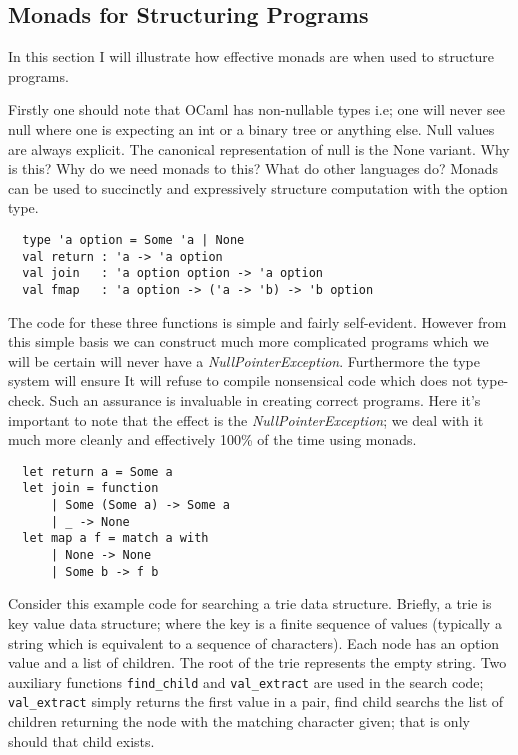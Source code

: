 \documentclass[a4paper,10pt]{article}
\theoremstyle{definition}
\begin{document}
\subsection{Monads for Structuring Programs}
In this section I will illustrate how effective monads are when used to structure programs.

Firstly one should note that OCaml has non-nullable types
i.e; one will never see null where one is expecting an
int or a binary tree or anything else.
Null values are always explicit.
The canonical representation of null is the None variant.
Why is this?
Why do we need monads to this?
What do other languages do?
Monads can be used to succinctly and expressively structure computation with the option type.

\begin{verbatim}
  type 'a option = Some 'a | None
  val return : 'a -> 'a option
  val join   : 'a option option -> 'a option
  val fmap   : 'a option -> ('a -> 'b) -> 'b option
\end{verbatim}

The code for these three functions is simple and fairly self-evident.
However from this simple basis we can construct much more complicated programs which we
will be certain will never have a \textit{NullPointerException}.
Furthermore the type system will ensure 
It will refuse to compile nonsensical code which does not type-check.
Such an assurance is invaluable in creating correct programs.
Here it's important to note that the effect is the \textit{NullPointerException};
we deal with it much more cleanly and effectively 100\% of the time using monads.

\begin{verbatim}
  let return a = Some a
  let join = function
      | Some (Some a) -> Some a
      | _ -> None
  let map a f = match a with
      | None -> None
      | Some b -> f b
\end{verbatim}

Consider this example code for searching a trie data structure.
Briefly, a trie is key value data structure;
where the key is a finite sequence of values
(typically a string which is equivalent to a sequence of characters).
Each node has an option value and a list of children.
The root of the trie represents the empty string.
Two auxiliary functions \texttt{find\_child} and \texttt{val\_extract}
are used in the search code; \texttt{val\_extract}
simply returns the first value in a pair,
find child searchs the list of children returning
the node with the matching character given;
that is only should that child exists.
\end{document}

